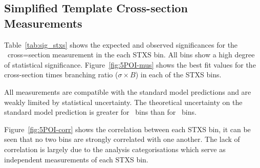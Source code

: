 \subsection{Simplified Template Cross-section Measurements}
Table~\ref{tab:sig_stxs} shows the expected and observed significances for
the \VHbb\ cross=section measurement in the each STXS bin. All bins show a high
degree of statistical significance. Figure~\ref{fig:5POI-mus} shows the best fit
values for the cross-section times branching ratio ($\sigma \times B$) in each
of the STXS bins.

All measurements are compatible with the standard model predictions and are
weakly limited by statistical uncertainty. The theoretical uncertainty on the
standard  model prediction is greater for \ZH\ bins than for \WH\ bins.

Figure~\ref{fig:5POI-corr} shows the correlation between each STXS bin, it can
be seen that no two bins are strongly correlated with one another. The lack of
correlation is largely due to the analysis categorisations which serve as
independent measurements of each STXS bin.

%
%
